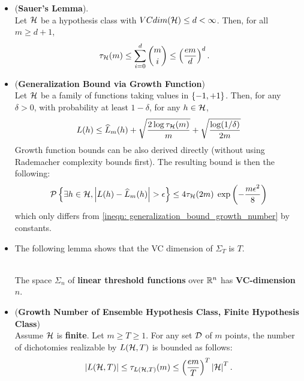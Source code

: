 \documentclass[11pt]{article}
\begin{document}
\begin{itemize}
\item \begin{lemma} (\textbf{Sauer's Lemma}). \citep{shalev2014understanding, mohri2018foundations}\\
Let ${\mathcal H}$ be a hypothesis class with $VCdim({\mathcal H}) \le d < \infty$. Then, for all $m \ge d + 1$, 
\begin{align}
\tau_{{\mathcal H}}(m) &\le \sum_{i=0}^{d}{{m}\choose{i}} \le \left(\frac{em}{d}\right)^{d}.  \label{eqn: sauer_lemma}
\end{align}
\end{lemma}

\item 
\begin{proposition} \label{cor: generalization_bound_growth}   (\textbf{Generalization Bound via Growth Function})  \citep{mohri2018foundations}\\
Let ${\mathcal H}$ be a family of functions taking values in $\left\{-1, +1\right\}$.  Then, for any $\delta > 0$, with probability at least $1 - \delta$, for any $h \in {\mathcal H}$,
\begin{align}
L(h) \le \widehat{L}_{m}(h) + \sqrt{\frac{2 \log \tau_{{\mathcal H}}(m)}{m}} +\sqrt{\frac{\log(1/\delta)}{2m}} \label{ineqn: generalization_bound_growth_number}
\end{align}
Growth function bounds can be also derived directly (without using Rademacher complexity bounds first). The resulting bound is then the following:
\begin{align}
{\mathcal P}\left\{\exists h\in {\mathcal H}, \left\lvert L(h) - \widehat{L}_{m}(h) \right\rvert > \epsilon \right\}  \le 4\tau_{{\mathcal H}}(2m)\;\exp\left(-\frac{m\epsilon^2}{8}\right) \label{ineqn: generalization_bound_growth_number_2}
\end{align}
which only differs from \eqref{ineqn: generalization_bound_growth_number} by constants.
\end{proposition}



\item The following lemma shows that the VC dimension of $\Sigma_T$ is $T$.
\begin{lemma} \citep{schapire2012boosting}\\
The space $\Sigma_n$ of \textbf{linear threshold functions} over ${\mathbb R}^n$ has \textbf{VC-dimension} $n$.
\end{lemma}

\item \begin{lemma} (\textbf{Growth Number of Ensemble Hypothesis Class, Finite Hypothesis Class}) \citep{schapire2012boosting, shalev2014understanding} \\
Assume ${\mathcal H}$ is \textbf{finite}. Let $m \ge T \ge 1$. For any set ${\mathcal D}$ of $m$ points, the number of dichotomies realizable by $L({\mathcal H}, T)$ is bounded as follows:
\begin{align}
\left\lvert L({\mathcal H}, T) \right\rvert \le \tau_{L({\mathcal H}, T)}(m) \le \left(\frac{em}{T}\right)^T \left\lvert {\mathcal H} \right\rvert^T.  \label{ineqn: growth_fun_ensemble_finite}
\end{align}
\end{lemma}


\end{itemize}
\end{document}
